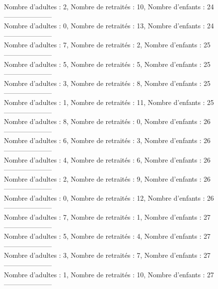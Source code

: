 \documentclass[10pt,a4paper]{article}
\begin{document}
Nombre d'adultes : 2, Nombre de retraités : 10, Nombre d'enfants : 24\\
---------------------\\
Nombre d'adultes : 0, Nombre de retraités : 13, Nombre d'enfants : 24\\
---------------------\\
Nombre d'adultes : 7, Nombre de retraités : 2, Nombre d'enfants : 25\\
---------------------\\
Nombre d'adultes : 5, Nombre de retraités : 5, Nombre d'enfants : 25\\
---------------------\\
Nombre d'adultes : 3, Nombre de retraités : 8, Nombre d'enfants : 25\\
---------------------\\
Nombre d'adultes : 1, Nombre de retraités : 11, Nombre d'enfants : 25\\
---------------------\\
Nombre d'adultes : 8, Nombre de retraités : 0, Nombre d'enfants : 26\\
---------------------\\
Nombre d'adultes : 6, Nombre de retraités : 3, Nombre d'enfants : 26\\
---------------------\\
Nombre d'adultes : 4, Nombre de retraités : 6, Nombre d'enfants : 26\\
---------------------\\
Nombre d'adultes : 2, Nombre de retraités : 9, Nombre d'enfants : 26\\
---------------------\\
Nombre d'adultes : 0, Nombre de retraités : 12, Nombre d'enfants : 26\\
---------------------\\
Nombre d'adultes : 7, Nombre de retraités : 1, Nombre d'enfants : 27\\
---------------------\\
Nombre d'adultes : 5, Nombre de retraités : 4, Nombre d'enfants : 27\\
---------------------\\
Nombre d'adultes : 3, Nombre de retraités : 7, Nombre d'enfants : 27\\
---------------------\\
Nombre d'adultes : 1, Nombre de retraités : 10, Nombre d'enfants : 27\\
---------------------\\
\end{document}
